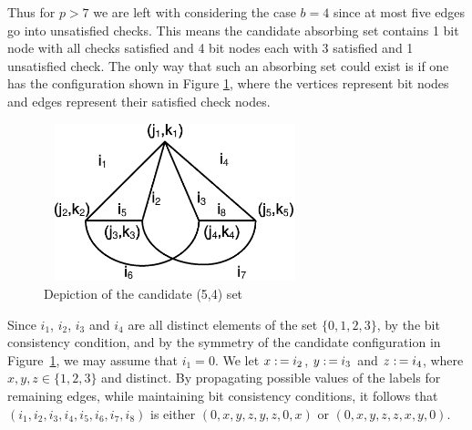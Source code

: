 Thus for $p>7$ we are left with considering the case $b=4$ since at
most five edges go into unsatisfied checks. This means the
 candidate absorbing set contains 1 bit node with all checks
satisfied and 4 bit nodes each with 3 satisfied and 1 unsatisfied
check. The only way that such an absorbing set could exist is if one
has the configuration shown in Figure \ref{fig52}, where the
vertices represent bit nodes and edges represent their satisfied
check nodes.


\begin{figure}
\center\includegraphics[width=3.0in,height=1.8in]{Drawing22_1.eps}
\caption{Depiction of the candidate (5,4) set} \label{fig52}
\end{figure}

Since $i_1$, $i_2$, $i_3$ and $i_4$ are all distinct elements of the
set $\{0,1,2,3\}$, by the bit consistency condition, and by the
symmetry of the candidate configuration in Figure~\ref{fig52}, we
may assume that $i_1=0$. We let $x \asn i_2$, $y \asn i_3$ and $z
\asn i_4$, where $x,y,z \in \{1,2,3 \}$ and distinct. By propagating
possible values of the labels for remaining edges, while maintaining
bit consistency conditions, it follows that
$(i_1,i_2,i_3,i_4,i_5,i_6,i_7,i_8)$ is either $(0,x,y,z,y,z,0,x)$ or
$(0,x,y,z,z,x,y,0)$.

